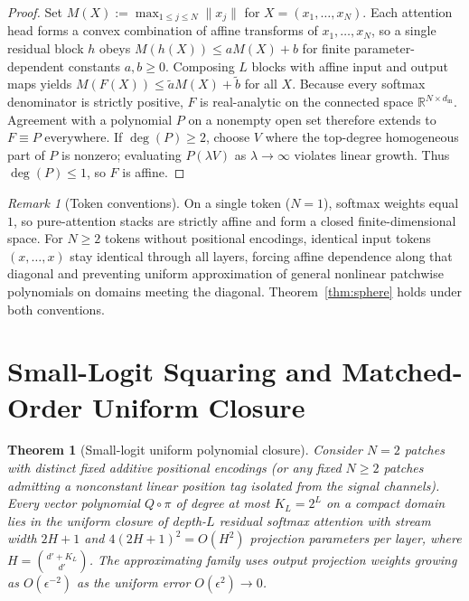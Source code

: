 \documentclass[11pt]{article}
\theoremstyle{plain}
\newtheorem{theorem}{Theorem}
\theoremstyle{definition}
\theoremstyle{remark}
\newtheorem{remark}{Remark}
\begin{document}
\begin{proof}
Set $M(X) := \max_{1 \le j \le N} \|x_j\|$ for $X = (x_1, \dots, x_N)$. Each attention head forms a convex combination of affine transforms of $x_1, \dots, x_N$, so a single residual block $h$ obeys $M(h(X)) \le a M(X) + b$ for finite parameter-dependent constants $a, b \ge 0$. Composing $L$ blocks with affine input and output maps yields $M(F(X)) \le \tilde{a} M(X) + \tilde{b}$ for all $X$. Because every softmax denominator is strictly positive, $F$ is real-analytic on the connected space $\mathbb{R}^{N \times d_{\mathrm{in}}}$. Agreement with a polynomial $P$ on a nonempty open set therefore extends to $F \equiv P$ everywhere. If $\deg(P) \ge 2$, choose $V$ where the top-degree homogeneous part of $P$ is nonzero; evaluating $P(\lambda V)$ as $\lambda \to \infty$ violates linear growth. Thus $\deg(P) \le 1$, so $F$ is affine.
\end{proof}

\begin{remark}[Token conventions]
On a single token ($N = 1$), softmax weights equal $1$, so pure-attention stacks are strictly affine and form a closed finite-dimensional space. For $N \ge 2$ tokens without positional encodings, identical input tokens $(x, \dots, x)$ stay identical through all layers, forcing affine dependence along that diagonal and preventing uniform approximation of general nonlinear patchwise polynomials on domains meeting the diagonal. Theorem~\ref{thm:sphere} holds under both conventions.
\end{remark}

\section{Small-Logit Squaring and Matched-Order Uniform Closure}

\begin{theorem}[Small-logit uniform polynomial closure]\label{thm:taylor}
Consider $N = 2$ patches with distinct fixed additive positional encodings (or any fixed $N \ge 2$ patches admitting a nonconstant linear position tag isolated from the signal channels). Every vector polynomial $Q \circ \pi$ of degree at most $K_L = 2^L$ on a compact domain lies in the uniform closure of depth-$L$ residual softmax attention with stream width $2H + 1$ and $4(2H + 1)^2 = O(H^2)$ projection parameters per layer, where $H = \binom{d' + K_L}{d'}$. The approximating family uses output projection weights growing as $O(\epsilon^{-2})$ as the uniform error $O(\epsilon^2) \to 0$.
\end{theorem}
\end{document}
